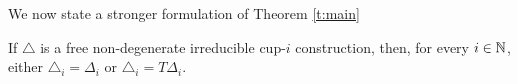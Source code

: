 We now state a stronger formulation of Theorem \ref{t:main}

\begin{theorem} \label{t:main reformulated}
	If $\triangle$ is a free non-degenerate irreducible cup-$i$ construction, then, for every $i \in \mathbb{N}$, either $\triangle_i = \Delta_i$ or $\triangle_i = T \Delta_i$.
\end{theorem}

%
